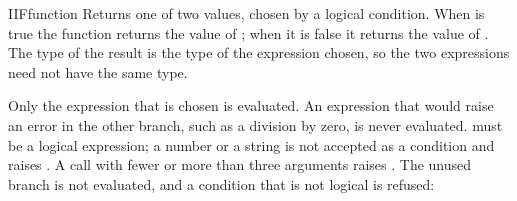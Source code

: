 \begin{XbaseEntry}{IIF}{function}
Returns one of two values, chosen by a logical condition.
\Syntax
{}
\Usage
When  is true the function returns the value of ; when it is false it returns the value of . The type of the result is the type of the expression chosen, so the two expressions need not have the same type.

Only the expression that is chosen is evaluated. An expression that would raise an error in the other branch, such as a division by zero, is never evaluated.  must be a logical expression; a number or a string is not accepted as a condition and raises . A call with fewer or more than three arguments raises .
\Examples
{}
The unused branch is not evaluated, and a condition that is not logical is refused:
\end{XbaseEntry}

